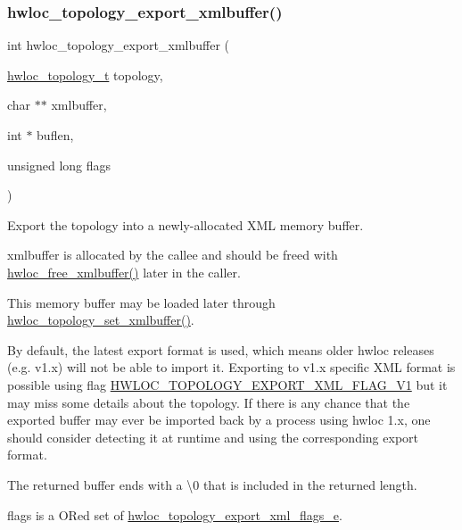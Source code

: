\subsubsection{\texorpdfstring{hwloc\+\_\+topology\+\_\+export\+\_\+xmlbuffer()}{hwloc\_topology\_export\_xmlbuffer()}}
{\footnotesize\ttfamily int hwloc\+\_\+topology\+\_\+export\+\_\+xmlbuffer (\begin{DoxyParamCaption}\item[{\hyperlink{a00186_ga9d1e76ee15a7dee158b786c30b6a6e38}{hwloc\+\_\+topology\+\_\+t}}]{topology,  }\item[{char $\ast$$\ast$}]{xmlbuffer,  }\item[{int $\ast$}]{buflen,  }\item[{unsigned long}]{flags }\end{DoxyParamCaption})}



Export the topology into a newly-\/allocated X\+ML memory buffer. 

{\ttfamily xmlbuffer} is allocated by the callee and should be freed with \hyperlink{a00206_ga293e4a6489f15fd16ad22a5734561cf1}{hwloc\+\_\+free\+\_\+xmlbuffer()} later in the caller.

This memory buffer may be loaded later through \hyperlink{a00192_ga2745616b65595e1c1e579ecc7e461fa8}{hwloc\+\_\+topology\+\_\+set\+\_\+xmlbuffer()}.

By default, the latest export format is used, which means older hwloc releases (e.\+g. v1.\+x) will not be able to import it. Exporting to v1.\+x specific X\+ML format is possible using flag \hyperlink{a00206_gga0eb99636aff71fe2704e1fa0ffe8c18dae7d6d96546131ef0043867b836b02e0f}{H\+W\+L\+O\+C\+\_\+\+T\+O\+P\+O\+L\+O\+G\+Y\+\_\+\+E\+X\+P\+O\+R\+T\+\_\+\+X\+M\+L\+\_\+\+F\+L\+A\+G\+\_\+\+V1} but it may miss some details about the topology. If there is any chance that the exported buffer may ever be imported back by a process using hwloc 1.\+x, one should consider detecting it at runtime and using the corresponding export format.

The returned buffer ends with a \textbackslash{}0 that is included in the returned length.

{\ttfamily flags} is a OR\textquotesingle{}ed set of \hyperlink{a00206_ga0eb99636aff71fe2704e1fa0ffe8c18d}{hwloc\+\_\+topology\+\_\+export\+\_\+xml\+\_\+flags\+\_\+e}.

